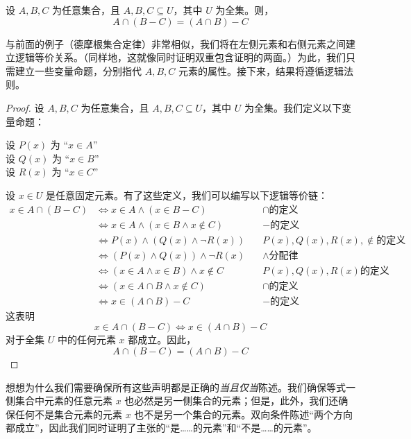 \begin{proposition}
    设 $A, B, C$ 为任意集合，且 $A, B, C \subseteq U$，其中 $U$ 为全集。则，
    \[A \cap (B - C) = (A \cap B) - C\]
\end{proposition}

与前面的例子（德摩根集合定律）非常相似，我们将在左侧元素和右侧元素之间建立逻辑等价关系。（同样地，这就像同时证明双重包含证明的两面。）为此，我们只需建立一些变量命题，分别指代 $A, B, C$ 元素的属性。接下来，结果将遵循逻辑法则。

\begin{proof}
    设 $A, B, C$ 为任意集合，且 $A, B, C \subseteq U$，其中 $U$ 为全集。我们定义以下变量命题：
    \begin{center}
        设 $P(x)$ 为 ``$x \in A$'' \\
        设 $Q(x)$ 为 ``$x \in B$'' \\
        设 $R(x)$ 为 ``$x \in C$'' \\
    \end{center}
    设 $x \in U$ 是任意固定元素。有了这些定义，我们可以编写以下逻辑等价链：
    \begin{align*}
        x \in A \cap (B - C) &\iff x \in A \land (x \in B - C) &\quad \cap \text{的定义} \\
        &\iff x \in A \land (x \in B \land x \notin C) &\quad - \text{的定义}\\
        &\iff P(x) \land (Q(x) \land \neg R(x)) &\quad P(x), Q(x), R(x), \notin \text{的定义} \\
        &\iff (P(x) \land Q(x)) \land \neg R(x) &\quad \land \text{分配律} \\
        &\iff (x \in A \land x \in B) \land x \notin C &\quad P(x), Q(x), R(x) \text{的定义}\\
        &\iff (x \in A \cap B \land x \notin C) &\quad \cap \text{的定义} \\
        &\iff x \in (A \cap B) - C &\quad - \text{的定义}
    \end{align*}
    这表明
    \[x \in A \cap (B - C) \iff x \in (A \cap B) - C\]
    对于全集 $U$ 中的任何元素 $x$ 都成立。因此，
    \[A \cap (B - C) = (A \cap B) - C\]
\end{proof}

想想为什么我们需要确保所有这些声明都是正确的\emph{当且仅当}陈述。我们确保等式一侧集合中元素的任意元素 $x$ 也必然是另一侧集合的元素；但是，此外，我们还确保任何不是集合元素的元素 $x$ 也不是另一个集合的元素。双向条件陈述``两个方向都成立''，因此我们同时证明了主张的``是……的元素''和``不是……的元素''。

